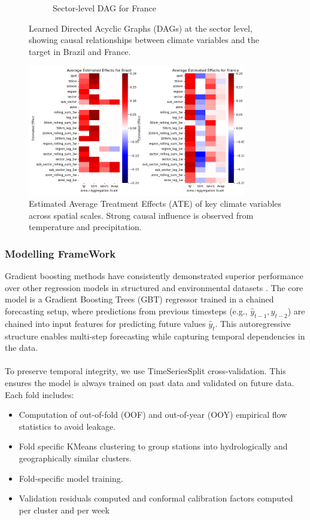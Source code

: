 \documentclass[ruler]{CUP-JNL-EDS}%
\begin{document}
\begin{figure}[!htp]
\begin{subfigure}[b]{0.48\textwidth}
        \caption{Sector-level DAG for France}
        \label{fig:dag_france}
    \end{subfigure}
    \caption{Learned Directed Acyclic Graphs (DAGs) at the sector level, showing causal relationships between climate variables and the target in Brazil and France.}
    \label{fig:sector_dags}
\end{figure}

\begin{figure}[!htp]
    \centering
    \includegraphics[width=0.85\textwidth]{./assets/images/ATEs.png}
    \caption{Estimated Average Treatment Effects (ATE) of key climate variables across spatial scales. Strong causal influence is observed from temperature and precipitation.}
    \label{fig:ate_heatmap}
\end{figure}

\subsubsection {Modelling FrameWork}
Gradient boosting methods have consistently demonstrated superior performance over other regression models in structured and environmental datasets \citep{shortridge2016, kumar2023}.
The core model is a Gradient Boosting Trees (GBT) regressor trained in a chained forecasting setup, where predictions from previous timesteps 
(e.g., \(\hat{y}_{t-1}, \hat{y}_{t-2}\)) are chained into input features for predicting future values \(\hat{y}_t\). 
This autoregressive structure enables multi-step forecasting while capturing temporal dependencies in the data.
\\ \\
To preserve temporal integrity, we use TimeSeriesSplit cross-validation. This ensures the model is always trained on past data and validated on future data. Each fold includes:
\begin{itemize}
    \item Computation of out-of-fold (OOF) and out-of-year (OOY) empirical flow statistics to avoid leakage.
    \item Fold specific KMeans clustering to group stations into hydrologically and geographically similar clusters.
    \item Fold-specific model training.
    \item Validation residuals computed and conformal calibration factors computed per cluster and per week
\end{itemize}
\end{document}
